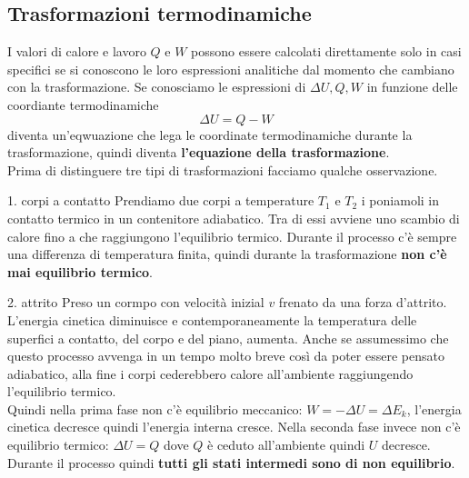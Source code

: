 \documentclass[x11names]{article}
\begin{document}
	\subsection{Trasformazioni termodinamiche}
	I valori di calore e lavoro \(Q\) e \(W\) possono essere calcolati direttamente solo in casi specifici se si conoscono le loro espressioni analitiche dal momento che cambiano con la trasformazione.  Se conosciamo le espressioni di \(\Delta U,Q,W\) in funzione delle coordiante termodinamiche 
	\[ 
	\Delta U = Q -W
	\]
	diventa un'eqwuazione che lega le coordinate termodinamiche durante la trasformazione, quindi diventa \textbf{l'equazione della trasformazione}.\\
	
	\noindent
	Prima di distinguere tre tipi di trasformazioni facciamo qualche osservazione.
	\begin{es}{1. corpi a contatto}
		Prendiamo due corpi a temperature \(T_1\) e \(T_2\) i poniamoli in contatto termico in un contenitore adiabatico. Tra di essi avviene uno scambio di calore fino a che raggiungono l'equilibrio termico. Durante il processo c'è sempre una differenza di temperatura finita, quindi durante la trasformazione \textbf{non c'è mai equilibrio termico}.
	\end{es}
	\begin{es}{2. attrito}
		Preso un cormpo con velocità inizial \(v\) frenato da una forza d'attrito. L'energia cinetica diminuisce e contemporaneamente la temperatura delle superfici a contatto, del corpo e del piano, aumenta. Anche se assumessimo che questo processo avvenga in un tempo molto breve così da poter essere pensato adiabatico, alla fine i corpi cederebbero calore all'ambiente raggiungendo l'equilibrio termico. \\
		
		Quindi nella prima fase non c'è equilibrio meccanico: \(W = -\Delta U = \Delta E_k\), l'energia cinetica decresce quindi l'energia interna cresce. Nella seconda fase invece non c'è equilibrio termico: \(\Delta U = Q\) dove \(Q\) è ceduto all'ambiente quindi \(U\) decresce. Durante il processo quindi \textbf{tutti gli stati intermedi sono di non equilibrio}.
	\end{es}
	
\end{document}

